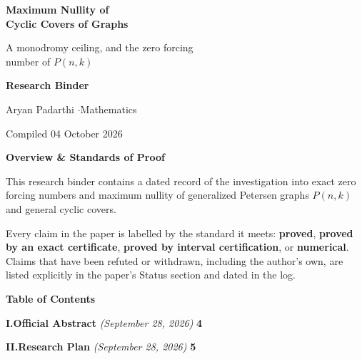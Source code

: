 \documentclass[11pt]{article}
\begin{document}
\thispagestyle{empty}
\vspace*{1.2in}
\begin{center}
{\Huge\bfseries Maximum Nullity of\\[0.25em] Cyclic Covers of Graphs\par}
\vspace{1.0em}
{\Large A monodromy ceiling, and the zero forcing\\number of $P(n,k)$\par}
\vspace{2.0em}
{\large\bfseries Research Binder\par}
\vspace{0.6em}
{\large Aryan Padarthi \quad$\cdot$\quad Mathematics\par}
\vspace{0.4em}
{\normalsize Compiled 04 October 2026\par}
\end{center}
\vfill
\begin{center}\begin{minipage}{0.88\textwidth}\small
\textbf{Overview \& Standards of Proof}\par\vspace{0.4em}
This research binder contains a dated record of the investigation into exact zero forcing numbers and maximum nullity of generalized Petersen graphs $P(n,k)$ and general cyclic covers.
\par\vspace{0.5em}
Every claim in the paper is labelled by the standard it meets: \textbf{proved}, \textbf{proved by an exact certificate}, \textbf{proved by interval certification}, or \textbf{numerical}. Claims that have been refuted or withdrawn, including the author's own, are listed explicitly in the paper's Status section and dated in the log.
\end{minipage}\end{center}
\vfill
\newpage
\begin{center}{\LARGE\bfseries Table of Contents}\end{center}\vspace{0.8em}
\par\noindent\textbf{\large I.\quad \textcolor{toclink}{Official Abstract}} \emph{(September 28, 2026)} \dotfill \textbf{\textcolor{toclink}{4}}\par\vspace{0.35em}
\par\noindent\textbf{\large II.\quad \textcolor{toclink}{Research Plan}} \emph{(September 28, 2026)} \dotfill \textbf{\textcolor{toclink}{5}}\par\vspace{0.35em}
\end{document}
